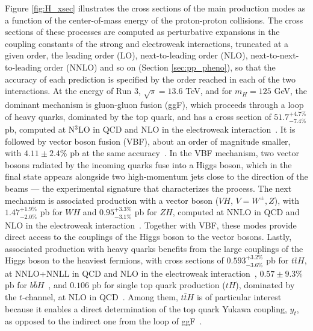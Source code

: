 Figure \ref{fig:H_xsec} illustrates the cross sections of the main production modes as a function of the center-of-mass energy of the proton-proton collisions. The cross sections of these processes are computed as perturbative expansions in the coupling constants of the strong and electroweak interactions, truncated at a given order, the leading order (LO), next-to-leading order (NLO), next-to-next-to-leading order (NNLO) and so on (Section \ref{sec:pp_pheno}), so that the accuracy of each prediction is specified by the order reached in each of the two interactions. At the energy of Run 3, $\sqrt{s} = 13.6$ TeV, and for $m_H = 125$ GeV, the dominant mechanism is gluon-gluon fusion (ggF), which proceeds through a loop of heavy quarks, dominated by the top quark, and has a cross section of $51.7^{+4.7\%}_{-7.4\%}$ pb, computed at N$^3$LO in QCD and NLO in the electroweak interaction~\cite{Anastasiou:2016cez,Mistlberger:2018etf,Dulat:2018rbf}. It is followed by vector boson fusion (VBF), about an order of magnitude smaller, with $4.11 \pm 2.4\%$ pb at the same accuracy~\cite{Dreyer:2016oyx,Ciccolini:2007jr}. In the VBF mechanism, two vector bosons radiated by the incoming quarks fuse into a Higgs boson, which in the final state appears alongside two high-momentum jets close to the direction of the beams — the experimental signature that characterizes the process. The next mechanism is associated production with a vector boson ($VH$, $V = W^\pm, Z$), with $1.47^{+1.9\%}_{-2.0\%}$ pb for $WH$ and $0.95^{+3.3\%}_{-3.1\%}$ pb for $ZH$, computed at NNLO in QCD and NLO in the electroweak interaction~\cite{Brein:2003wg,Brein:2012ne,Denner:2011id}. Together with VBF, these modes provide direct access to the couplings of the Higgs boson to the vector bosons. Lastly, associated production with heavy quarks benefits from the large couplings of the Higgs boson to the heaviest fermions, with cross sections of $0.593^{+3.2\%}_{-3.6\%}$ pb for $t\bar{t}H$, at NNLO+NNLL in QCD and NLO in the electroweak interaction~\cite{Catani:2022mfv,Frederix:2018nkq}, $0.57 \pm 9.3\%$ pb for $b\bar{b}H$~\cite{Bonvini:2016fgf}, and $0.106$ pb for single top quark production ($tH$), dominated by the $t$-channel, at NLO in QCD~\cite{Demartin:2015uha}. Among them, $t\bar{t}H$ is of particular interest because it enables a direct determination of the top quark Yukawa coupling, $y_t$, as opposed to the indirect one from the loop of ggF~\cite{LHCHWG:2026R5}. 






